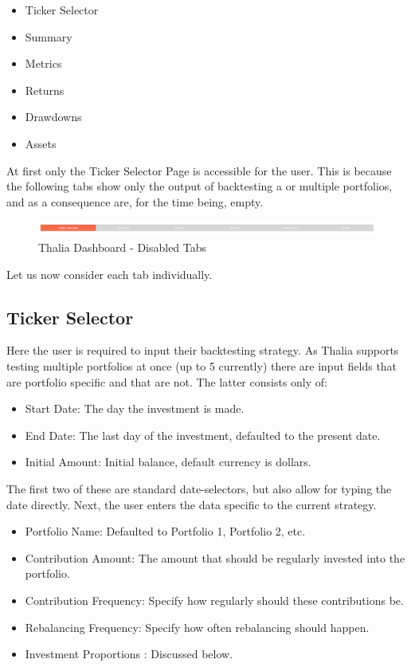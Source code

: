 \documentclass[main.tex]{subfiles}
\begin{document}
\begin{itemize}
    \item Ticker Selector
    \item Summary
    \item Metrics
    \item Returns 
    \item Drawdowns
    \item Assets
\end{itemize}

At first only the Ticker Selector Page is accessible for the user. 
This is because the following tabs show only the output of backtesting a or multiple portfolios, and as a consequence are, for the time being, empty.

\begin{figure}[H]
   \centering
   \includegraphics[width=\textwidth]{10Appendices/081User/081Pictures/disabled_tabs.png}
   \caption{Thalia Dashboard - Disabled Tabs}
   \label{thalia_disabled_tabs}
\end{figure}

Let us now consider each tab individually. 

\subsection*{Ticker Selector}

Here the user is required to input their backtesting strategy. As Thalia supports testing multiple portfolios at once (up to 5 currently) there are input fields that are 
portfolio specific and that are not. The latter consists only of:

\begin{itemize}
    \item Start Date: The day the investment is made.
    \item End Date: The last day of the investment, defaulted to the present date.
    \item Initial Amount: Initial balance, default currency is dollars.
\end{itemize}

The first two of these are standard date-selectors, but also allow for typing the date directly. Next, the user enters the data specific to the current strategy.

\begin{itemize}
    \item Portfolio Name: Defaulted to Portfolio 1, Portfolio 2, etc. 
    \item Contribution Amount: The amount that should be regularly invested into the portfolio.
    \item Contribution Frequency: Specify how regularly should these contributions be.
    \item Rebalancing Frequency: Specify how often rebalancing should happen. 
    \item Investment Proportions : Discussed below.
\end{itemize}
\end{document}
